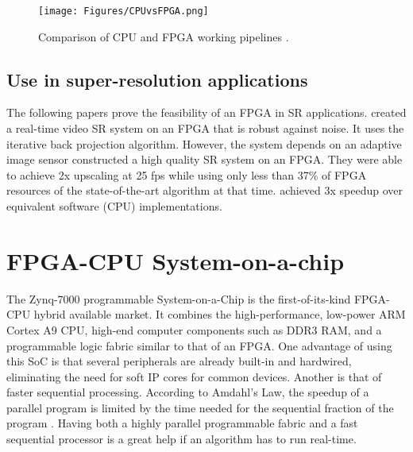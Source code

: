 \begin{figure}[!ht]
	\centering
	\texttt{[image: Figures/CPUvsFPGA.png]}
	\label{fig:CPUvsFPGA}
	\caption[]{Comparison of CPU and FPGA working pipelines \citep{Flynn2012}.}
\end{figure}

\subsection{Use in super-resolution applications}
The following papers prove the feasibility of an FPGA in SR applications.
\cite{Angelopoulou2009} created a real-time video SR system on an FPGA that is robust against noise.
It uses the iterative back projection algorithm. 
However, the system depends on an adaptive image sensor 
\cite{Szydzik2011} constructed a high quality SR system on an FPGA. 
They were able to achieve 2x upscaling at 25 fps while using only less than 37\% of FPGA resources of the state-of-the-art algorithm at that time.
\cite{Bowen2008} achieved 3x speedup over equivalent software (CPU) implementations.


\section{FPGA-CPU System-on-a-chip}

The Zynq-7000 programmable System-on-a-Chip is the first-of-its-kind FPGA-CPU hybrid available market.
It combines the high-performance, low-power ARM Cortex A9 CPU, high-end computer components such as DDR3 RAM, and a programmable logic fabric similar to that of an FPGA.
One advantage of using this SoC is that several peripherals are already built-in and hardwired, eliminating the need for soft IP cores for common devices.
Another is that of faster sequential processing. 
According to Amdahl's Law, the speedup of a parallel program is limited by the time needed for the sequential fraction of the program \citep{Amdahl1967}.
Having both a highly parallel programmable fabric and a fast sequential processor is a great help if an algorithm has to run real-time.
